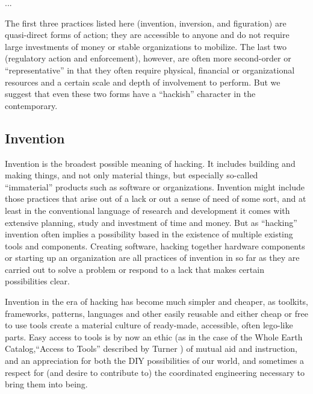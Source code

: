 \documentclass[10pt,letter,oneside]{scrartcl}
\begin{document}
...

The first three practices listed here (invention, inversion, and figuration) are
quasi-direct forms of action; they are accessible to anyone and do not require
large investments of money or stable organizations to mobilize.  The last two
(regulatory action and enforcement), however, are often more second-order or
``representative'' in that they often require physical, financial or
organizational resources and a certain scale and depth of involvement to
perform.  But we suggest that even these two forms have a ``hackish'' character
in the contemporary.





\subsection*{Invention}

Invention is the broadest possible meaning of hacking. It includes building and
making things, and not only material things, but especially so-called
``immaterial'' products such as software or organizations.  Invention might
include those practices that arise out of a lack or out a sense of need of some
sort, and at least in the conventional language of research and development it
comes with extensive planning, study and investment of time and money.  But as
``hacking'' invention often implies a possibility based in the existence of
multiple existing tools and components.  Creating software, hacking together
hardware components or starting up an organization are all practices of
invention in so far as they are carried out to solve a problem or respond to a
lack that makes certain possibilities clear.

Invention in the era of hacking has become much simpler and cheaper, as
toolkits, frameworks, patterns, languages and other easily reusable and either
cheap or free to use tools create a material culture of ready-made, accessible,
often lego-like parts.  Easy access to tools is by now an ethic (as in the case
of the Whole Earth Catalog,``Access to Tools'' described by Turner
\cite*{turner_counterculture_2006}) of mutual aid and instruction, and an
appreciation for both the DIY possibilities of our world, and sometimes a
respect for (and desire to contribute to) the coordinated engineering necessary
to bring them into being.
\end{document}
